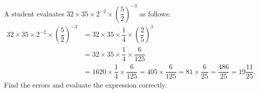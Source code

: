 A student evaluates $32\times35\times2^{-2}\times\left(\dfrac52\right)^{-3}$ as follows:
\begin{align*}
32\times35\times2^{-2}\times\left(\dfrac52\right)^{-3}&=32\times35\times\dfrac14\times\left(\dfrac25\right)^3\\
&=32\times35\times\dfrac14\times\dfrac{6}{125}\\
&=1620\times\dfrac14\times\dfrac{6}{125}=405\times\dfrac{6}{125}=81\times\dfrac{6}{25}=\dfrac{486}{25}=19\dfrac{11}{25}.
\end{align*}
Find the errors and evaluate the expression correctly.
